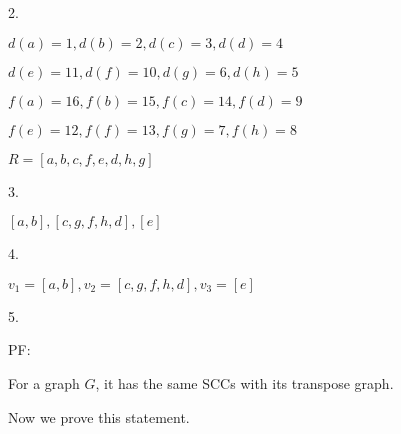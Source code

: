 \documentclass[12pt]{article}
\begin{document}
2.

$d(a) = 1, d(b) = 2, d(c) = 3, d(d) = 4$ 

$d(e) = 11, d(f) = 10, d(g) = 6, d(h) = 5$

$f(a) = 16, f(b) = 15, f(c) = 14, f(d) = 9$ 

$f(e) = 12, f(f) = 13, f(g) = 7, f(h) = 8$

$R = [a, b, c, f, e, d, h, g]$

3.

$[a, b], [c, g, f, h, d], [e]$

4.

$v_1=[a, b], v_2=[c, g, f, h, d], v_3=[e]$
\begin{center}
\end{center}

5.

PF:

For a graph $G$, it has the same SCCs with its transpose graph.

Now we prove this statement. 
\end{document}
